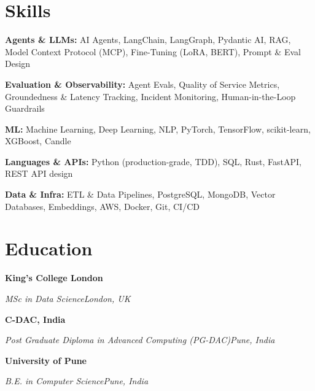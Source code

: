 \documentclass[10pt,a4paper]{article}
\newcommand{\entry}[4]{%
  {\color{company}\bfseries #1}\hfill {\color{muted}#2}\par
  \vspace{1pt}
  {\itshape #3}\hfill {\color{muted}\itshape #4}\par
  \vspace{3pt}%
}
\begin{document}
\section{Skills}
\begin{tight}
  \item[\textcolor{accent}{\small$\bullet$}] \textbf{Agents \& LLMs:} AI Agents, LangChain, LangGraph, Pydantic AI, RAG, Model Context Protocol (MCP), Fine-Tuning (LoRA, BERT), Prompt \& Eval Design
  \item[\textcolor{accent}{\small$\bullet$}] \textbf{Evaluation \& Observability:} Agent Evals, Quality of Service Metrics, Groundedness \& Latency Tracking, Incident Monitoring, Human-in-the-Loop Guardrails
  \item[\textcolor{accent}{\small$\bullet$}] \textbf{ML:} Machine Learning, Deep Learning, NLP, PyTorch, TensorFlow, scikit-learn, XGBoost, Candle
  \item[\textcolor{accent}{\small$\bullet$}] \textbf{Languages \& APIs:} Python (production-grade, TDD), SQL, Rust, FastAPI, REST API design
  \item[\textcolor{accent}{\small$\bullet$}] \textbf{Data \& Infra:} ETL \& Data Pipelines, PostgreSQL, MongoDB, Vector Databases, Embeddings, AWS, Docker, Git, CI/CD
\end{tight}

\section{Education}
\entry{King's College London}{}{MSc in Data Science}{London, UK}
\vspace{-3pt}
\entry{C-DAC, India}{}{Post Graduate Diploma in Advanced Computing (PG-DAC)}{Pune, India}
\vspace{-3pt}
\entry{University of Pune}{}{B.E. in Computer Science}{Pune, India}
\end{document}
